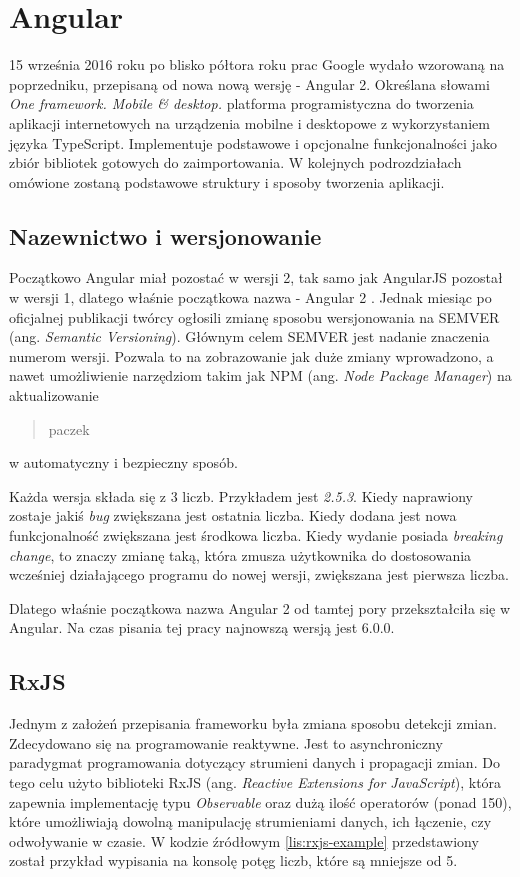 \section{Angular}
	15 września 2016 roku po blisko półtora roku prac Google wydało wzorowaną na poprzedniku, przepisaną od nowa nową wersję - Angular 2. Określana słowami \textit{One framework. Mobile \& desktop.} platforma programistyczna do tworzenia aplikacji internetowych na urządzenia mobilne i desktopowe z wykorzystaniem języka TypeScript. Implementuje podstawowe i opcjonalne funkcjonalności jako zbiór bibliotek gotowych do zaimportowania. W kolejnych podrozdziałach omówione zostaną podstawowe struktury i sposoby tworzenia aplikacji.
	
	\subsection{Nazewnictwo i wersjonowanie}  
	Początkowo Angular miał pozostać w wersji 2, tak samo jak AngularJS pozostał w wersji 1, dlatego właśnie początkowa nazwa - Angular 2 \cite{angular-versioning}. Jednak miesiąc po oficjalnej publikacji twórcy ogłosili zmianę sposobu wersjonowania na SEMVER (ang. \textit{Semantic Versioning}). Głównym celem SEMVER jest nadanie znaczenia numerom wersji. Pozwala to na zobrazowanie jak duże zmiany wprowadzono, a nawet umożliwienie narzędziom takim jak NPM (ang. \textit{Node Package Manager}) na aktualizowanie \blockquote{paczek} w automatyczny i bezpieczny sposób.\par
	
	Każda wersja składa się z 3 liczb. Przykładem jest \textit{2.5.3}. Kiedy naprawiony zostaje jakiś \textit{bug} zwiększana jest ostatnia liczba. Kiedy dodana jest nowa funkcjonalność zwiększana jest środkowa liczba. Kiedy wydanie posiada \textit{breaking change}, to znaczy zmianę taką, która zmusza użytkownika do dostosowania wcześniej działającego programu do nowej wersji, zwiększana jest pierwsza liczba.\par
	
	Dlatego właśnie początkowa nazwa Angular 2 od tamtej pory przekształciła się w Angular. Na czas pisania tej pracy najnowszą wersją jest 6.0.0.
	
	\subsection{RxJS}
	Jednym z założeń przepisania frameworku była zmiana sposobu detekcji zmian. Zdecydowano się na programowanie reaktywne. Jest to asynchroniczny paradygmat programowania dotyczący strumieni danych i propagacji zmian. Do tego celu użyto biblioteki RxJS (ang. \textit{Reactive Extensions for JavaScript}), która zapewnia implementację typu \textit{Observable} oraz dużą ilość operatorów (ponad 150), które umożliwiają dowolną manipulację strumieniami danych, ich łączenie, czy odwoływanie w czasie. W kodzie źródłowym \ref{lis:rxjs-example} przedstawiony został przykład wypisania na konsolę potęg liczb, które są mniejsze od 5.
	
